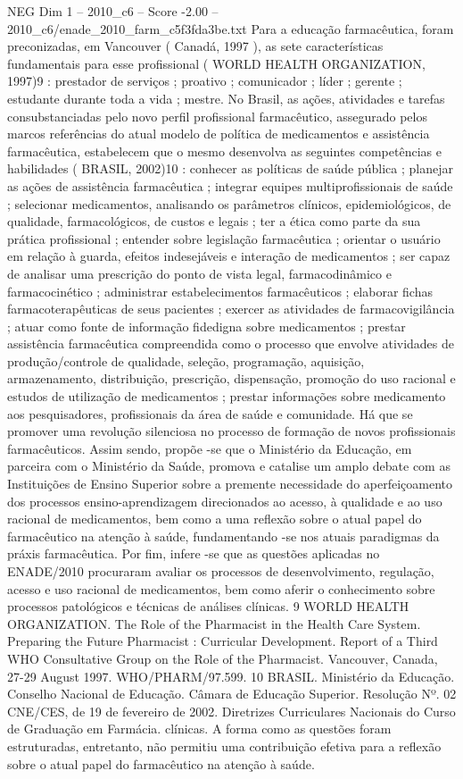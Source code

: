 \begin{textsample}{NEG Dim 1 – 2010\_c6 – Score -2.00 – 2010\_c6/enade\_2010\_farm\_c5f3fda3be.txt}
Para a educação farmacêutica, foram preconizadas, em Vancouver ( Canadá, 1997 ), as sete características fundamentais para esse profissional ( WORLD HEALTH ORGANIZATION, 1997)9 : prestador de serviços ; proativo ; comunicador ; líder ; gerente ; estudante durante toda a vida ; mestre.
No Brasil, as ações, atividades e tarefas consubstanciadas pelo novo perfil profissional farmacêutico, assegurado pelos marcos referências do atual modelo de política de medicamentos e assistência farmacêutica, estabelecem que o mesmo desenvolva as seguintes competências e habilidades ( BRASIL, 2002)10 : conhecer as políticas de saúde pública ; planejar as ações de assistência farmacêutica ; integrar equipes multiprofissionais de saúde ; selecionar medicamentos, analisando os parâmetros clínicos, epidemiológicos, de qualidade, farmacológicos, de custos e legais ; ter a ética como parte da sua prática profissional ; entender sobre legislação farmacêutica ; orientar o usuário em relação à guarda, efeitos indesejáveis e interação de medicamentos ; ser capaz de analisar uma prescrição do ponto de vista legal, farmacodinâmico e farmacocinético ; administrar estabelecimentos farmacêuticos ; elaborar fichas farmacoterapêuticas de seus pacientes ; exercer as atividades de farmacovigilância ; atuar como fonte de informação fidedigna sobre medicamentos ; prestar assistência farmacêutica compreendida como o processo que envolve atividades de produção/controle de qualidade, seleção, programação, aquisição, armazenamento, distribuição, prescrição, dispensação, promoção do uso racional e estudos de utilização de medicamentos ; prestar informações sobre medicamento aos pesquisadores, profissionais da área de saúde e comunidade.
Há que se promover uma revolução silenciosa no processo de formação de novos profissionais farmacêuticos.
Assim sendo, propõe -se que o Ministério da Educação, em parceira com o Ministério da Saúde, promova e catalise um amplo debate com as Instituições de Ensino Superior sobre a premente necessidade do aperfeiçoamento dos processos ensino-aprendizagem direcionados ao acesso, à qualidade e ao uso racional de medicamentos, bem como a uma reflexão sobre o atual papel do farmacêutico na atenção à saúde, fundamentando -se nos atuais paradigmas da práxis farmacêutica.
Por fim, infere -se que as questões aplicadas no ENADE/2010 procuraram avaliar os processos de desenvolvimento, regulação, acesso e uso racional de medicamentos, bem como aferir o conhecimento sobre processos patológicos e técnicas de análises clínicas. 9 WORLD HEALTH ORGANIZATION.
The Role of the Pharmacist in the Health Care System.
Preparing the Future Pharmacist : Curricular Development.
Report of a Third WHO Consultative Group on the Role of the Pharmacist.
Vancouver, Canada, 27-29 August 1997.
WHO/PHARM/97.599. 10 BRASIL.
Ministério da Educação.
Conselho Nacional de Educação.
Câmara de Educação Superior.
Resolução Nº. 02 CNE/CES, de 19 de fevereiro de 2002.
Diretrizes Curriculares Nacionais do Curso de Graduação em Farmácia. clínicas.
A forma como as questões foram estruturadas, entretanto, não permitiu uma contribuição efetiva para a reflexão sobre o atual papel do farmacêutico na atenção à saúde.

\end{textsample}
